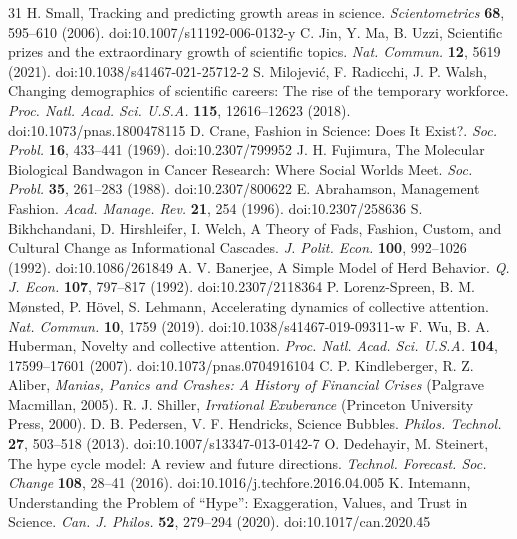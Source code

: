\begin{thebibliography}{31}
 H. Small, Tracking and predicting growth areas in science. \textit{Scientometrics} \textbf{68}, 595–610 (2006). doi:10.1007/s11192-006-0132-y
 C. Jin, Y. Ma, B. Uzzi, Scientific prizes and the extraordinary growth of scientific topics. \textit{Nat. Commun.} \textbf{12}, 5619 (2021). doi:10.1038/s41467-021-25712-2
 S. Milojević, F. Radicchi, J. P. Walsh, Changing demographics of scientific careers: The rise of the temporary workforce. \textit{Proc. Natl. Acad. Sci. U.S.A.} \textbf{115}, 12616–12623 (2018). doi:10.1073/pnas.1800478115
 D. Crane, Fashion in Science: Does It Exist?. \textit{Soc. Probl.} \textbf{16}, 433–441 (1969). doi:10.2307/799952
 J. H. Fujimura, The Molecular Biological Bandwagon in Cancer Research: Where Social Worlds Meet. \textit{Soc. Probl.} \textbf{35}, 261–283 (1988). doi:10.2307/800622
 E. Abrahamson, Management Fashion. \textit{Acad. Manage. Rev.} \textbf{21}, 254 (1996). doi:10.2307/258636
 S. Bikhchandani, D. Hirshleifer, I. Welch, A Theory of Fads, Fashion, Custom, and Cultural Change as Informational Cascades. \textit{J. Polit. Econ.} \textbf{100}, 992–1026 (1992). doi:10.1086/261849
 A. V. Banerjee, A Simple Model of Herd Behavior. \textit{Q. J. Econ.} \textbf{107}, 797–817 (1992). doi:10.2307/2118364
 P. Lorenz-Spreen, B. M. Mønsted, P. Hövel, S. Lehmann, Accelerating dynamics of collective attention. \textit{Nat. Commun.} \textbf{10}, 1759 (2019). doi:10.1038/s41467-019-09311-w
 F. Wu, B. A. Huberman, Novelty and collective attention. \textit{Proc. Natl. Acad. Sci. U.S.A.} \textbf{104}, 17599–17601 (2007). doi:10.1073/pnas.0704916104
 C. P. Kindleberger, R. Z. Aliber, \textit{Manias, Panics and Crashes: A History of Financial Crises} (Palgrave Macmillan, 2005).
 R. J. Shiller, \textit{Irrational Exuberance} (Princeton University Press, 2000).
 D. B. Pedersen, V. F. Hendricks, Science Bubbles. \textit{Philos. Technol.} \textbf{27}, 503–518 (2013). doi:10.1007/s13347-013-0142-7
 O. Dedehayir, M. Steinert, The hype cycle model: A review and future directions. \textit{Technol. Forecast. Soc. Change} \textbf{108}, 28–41 (2016). doi:10.1016/j.techfore.2016.04.005
 K. Intemann, Understanding the Problem of “Hype”: Exaggeration, Values, and Trust in Science. \textit{Can. J. Philos.} \textbf{52}, 279–294 (2020). doi:10.1017/can.2020.45

\end{thebibliography}
